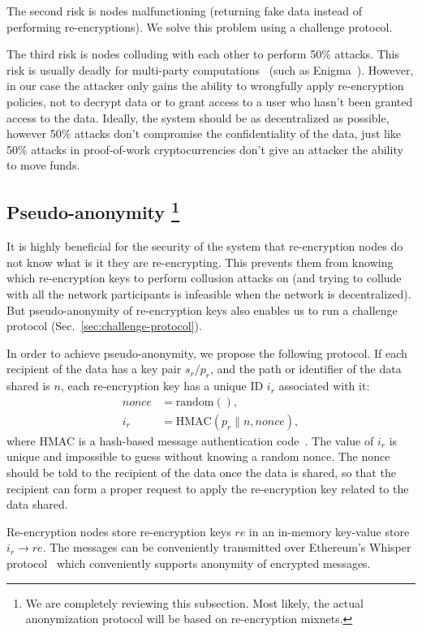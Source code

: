 \documentclass[longbibliography,nofootinbib]{revtex4-1}
\begin{document}
The second risk is nodes malfunctioning (returning fake data instead of performing re-encryptions).
We solve this problem using a challenge protocol.

The third risk is nodes colluding with each other to perform 50\% attacks.
This risk is usually deadly for multi-party computations~\cite{vitalik-secret-dao} (such as Enigma~\cite{enigma}). However, in our case the attacker only gains the ability to wrongfully apply re-encryption policies, not to decrypt data or to grant access to a user who hasn't been granted access to the data.
Ideally, the system should be as decentralized as possible, however 50\% attacks don't compromise the confidentiality of the data, just like 50\% attacks in
proof-of-work cryptocurrencies don't give an attacker the ability to move funds.

\subsection{Pseudo-anonymity
\footnote{We are completely reviewing this subsection.
Most likely, the actual anonymization protocol will be based on re-encryption mixnets.}
}
\label{sec:anonymity}

It is highly beneficial for the security of the system that re-encryption nodes do not know what is it they are re-encrypting.
This prevents them from knowing which re-encryption keys to perform collusion attacks on (and trying to collude with all the network participants
is infeasible when the network is decentralized).
But pseudo-anonymity of re-encryption keys also enables us to run a challenge protocol (Sec.~\ref{sec:challenge-protocol}).

In order to achieve pseudo-anonymity, we propose the following protocol.
If each recipient of the data has a key pair $s_r/p_r$, and the path or identifier of the data shared is $n$,
each re-encryption key has a unique ID $i_r$ associated with it:
\begin{align}
    nonce &= \text{random}(), \\
    i_r &= \text{HMAC}(p_r \| n, nonce),
\end{align}
where HMAC is a hash-based message authentication code~\cite{wiki:hmac}.
The value of $i_r$ is unique and impossible to guess without knowing a random nonce.
The nonce should be told to the recipient of the data once the data is shared, so that the recipient can form a proper request to apply the re-encryption key
related to the data shared.

Re-encryption nodes store re-encryption keys $re$ in an in-memory key-value store $i_r\rightarrow re$.
The messages can be conveniently transmitted over Ethereum's Whisper protocol~\cite{eth:whisper} which conveniently supports
anonymity of encrypted messages.
\end{document}
